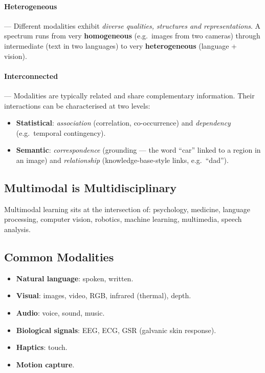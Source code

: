 \documentclass[11pt,a4paper]{article}
\theoremstyle{definition}
\theoremstyle{plain}
\theoremstyle{remark}
\begin{document}
\paragraph{Heterogeneous} --- Different modalities exhibit \emph{diverse qualities, structures and representations}. A spectrum runs from very \textbf{homogeneous} (e.g.\ images from two cameras) through intermediate (text in two languages) to very \textbf{heterogeneous} (language + vision).

\paragraph{Interconnected} --- Modalities are typically related and share complementary information. Their interactions can be characterised at two levels:
\begin{itemize}
    \item \textbf{Statistical}: \emph{association} (correlation, co-occurrence) and \emph{dependency} (e.g.\ temporal contingency).
    \item \textbf{Semantic}: \emph{correspondence} (grounding --- the word ``car'' linked to a region in an image) and \emph{relationship} (knowledge-base-style links, e.g.\ ``dad'').
\end{itemize}

\subsection{Multimodal is Multidisciplinary}

Multimodal learning sits at the intersection of: psychology, medicine, language processing, computer vision, robotics, machine learning, multimedia, speech analysis.

\subsection{Common Modalities}

\begin{itemize}
    \item \textbf{Natural language}: spoken, written.
    \item \textbf{Visual}: images, video, RGB, infrared (thermal), depth.
    \item \textbf{Audio}: voice, sound, music.
    \item \textbf{Biological signals}: EEG, ECG, GSR (galvanic skin response).
    \item \textbf{Haptics}: touch.
    \item \textbf{Motion capture}.
\end{itemize}
\end{document}
